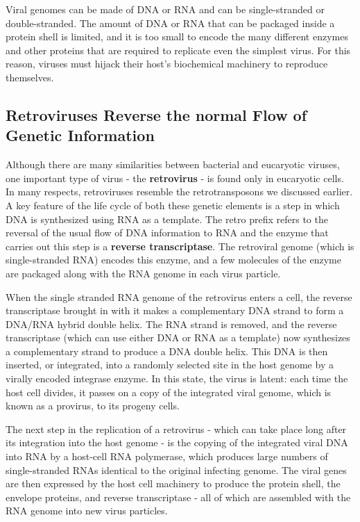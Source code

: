 Viral genomes can be made of DNA or RNA and can be single-stranded
or double-stranded. The amount of DNA or RNA that can be
packaged inside a protein shell is limited, and it is too small to encode the
many different enzymes and other proteins that are required to replicate
even the simplest virus. For this reason, viruses must hijack their host’s
biochemical machinery to reproduce themselves.

\subsection{Retroviruses Reverse the normal Flow of Genetic Information}

Although there are many similarities between bacterial and eucaryotic
viruses, one important type of virus - the \textbf{retrovirus} - is found only in
eucaryotic cells. In many respects, retroviruses resemble the retrotransposons
we discussed earlier. A key feature of the life cycle of both these
genetic elements is a step in which DNA is synthesized using RNA as a
template. The retro prefix refers to the reversal of the usual flow of DNA
information to RNA and the enzyme that carries out this
step is a \textbf{reverse transcriptase}. The retroviral genome (which is single-stranded
RNA) encodes this enzyme, and a few molecules of the enzyme
are packaged along with the RNA genome in each virus particle.

When the single stranded RNA genome of the retrovirus enters a cell, the reverse
transcriptase brought in with it makes a complementary DNA strand
to form a DNA/RNA hybrid double helix. The RNA strand is removed,
and the reverse transcriptase (which can use either DNA or RNA as a
template) now synthesizes a complementary strand to produce a DNA
double helix. This DNA is then inserted, or integrated, into a randomly
selected site in the host genome by a virally encoded integrase enzyme.
In this state, the virus is latent: each time the host cell divides, it passes
on a copy of the integrated viral genome, which is known as a provirus,
to its progeny cells.

The next step in the replication of a retrovirus - which can take place
long after its integration into the host genome - is the copying of the
integrated viral DNA into RNA by a host-cell RNA polymerase, which
produces large numbers of single-stranded RNAs identical to the original
infecting genome. The viral genes are then expressed by the host
cell machinery to produce the protein shell, the envelope proteins, and
reverse transcriptase - all of which are assembled with the RNA genome
into new virus particles.

